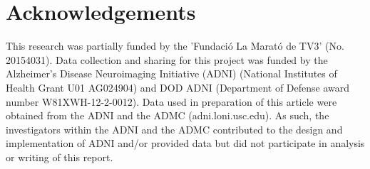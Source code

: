 \section*{Acknowledgements}
This research was partially funded by the 'Fundació La Marató de TV3' (No. 20154031). Data collection and sharing for this project was funded by the Alzheimer’s Disease Neuroimaging Initiative (ADNI) (National Institutes of Health Grant U01 AG024904) and DOD ADNI (Department of Defense award number W81XWH-12-2-0012).  Data used in preparation of this article were obtained from the ADNI and the ADMC (adni.loni.usc.edu). As such, the investigators within the ADNI and the ADMC contributed to the design and implementation of ADNI and/or provided data but did not participate in analysis or writing of this report.